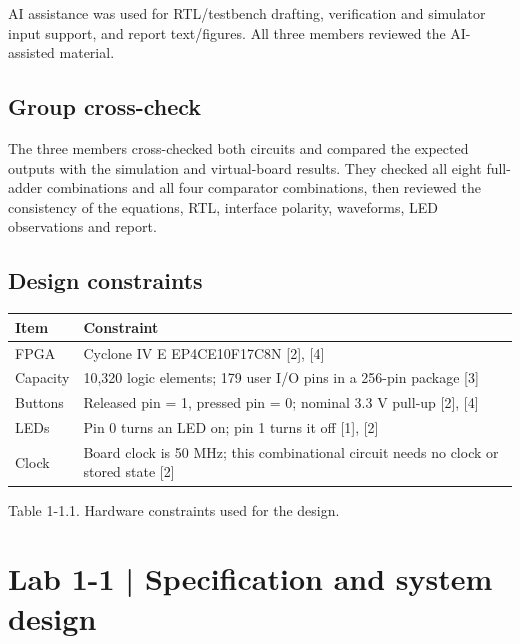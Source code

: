 \documentclass[10pt,a4paper]{article}
\begin{document}
AI assistance was used for RTL/testbench drafting, verification and simulator input support, and report text/figures. All three members reviewed the AI-assisted material.\par

\subsection*{Group cross-check}

The three members cross-checked both circuits and compared the expected outputs with the simulation and virtual-board results. They checked all eight full-adder combinations and all four comparator combinations, then reviewed the consistency of the equations, RTL, interface polarity, waveforms, LED observations and report.\par

\subsection*{Design constraints}

\begingroup\small\setlength{\tabcolsep}{4pt}
\renewcommand{\arraystretch}{1.20}
\noindent\begin{tabular}{@{}p{}p{}@{}}
\toprule
\textbf{Item} & \textbf{Constraint} \\
\midrule
FPGA & Cyclone IV E EP4CE10F17C8N [2], [4] \\
Capacity & 10,320 logic elements; 179 user I/O pins in a 256-pin package [3] \\
Buttons & Released pin = 1, pressed pin = 0; nominal 3.3 V pull-up [2], [4] \\
LEDs & Pin 0 turns an LED on; pin 1 turns it off [1], [2] \\
Clock & Board clock is 50 MHz; this combinational circuit needs no clock or stored state [2] \\
\bottomrule
\end{tabular}\par\endgroup
\vspace{2mm}

{\small\raggedright Table 1-1.1. Hardware constraints used for the design.\par}

\clearpage

\section*{Lab 1-1 | Specification and system design}
\end{document}
